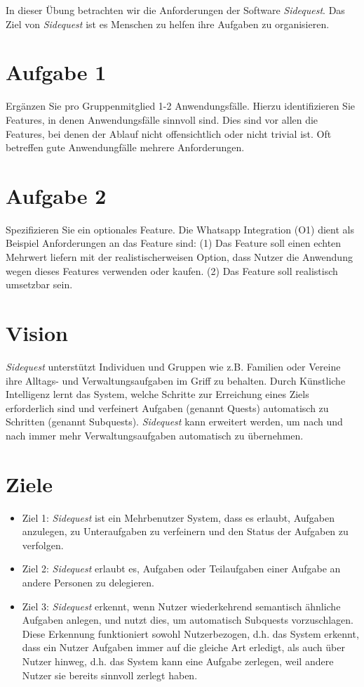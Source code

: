 \documentclass{article}
\begin{document}
\thispagestyle{page1} 
In dieser Übung betrachten wir die Anforderungen der Software \textit{Sidequest}. Das Ziel von \textit{Sidequest} ist es Menschen zu helfen ihre Aufgaben zu organisieren.

\section{Aufgabe 1}
Ergänzen Sie pro Gruppenmitglied 1-2 Anwendungsfälle. Hierzu identifizieren Sie Features, in denen Anwendungsfälle sinnvoll sind. Dies sind vor allen die Features, bei denen der Ablauf nicht offensichtlich oder nicht trivial ist. Oft betreffen gute Anwendungfälle mehrere Anforderungen.

\section{Aufgabe 2}
Spezifizieren Sie ein optionales Feature. Die Whatsapp  Integration (O1) dient als Beispiel Anforderungen an das Feature sind: (1) Das Feature soll einen echten Mehrwert liefern mit der realistischerweisen Option, dass Nutzer die Anwendung wegen dieses Features verwenden oder kaufen. (2) Das Feature soll realistisch umsetzbar sein. 

\section{Vision}

\textit{Sidequest} unterstützt Individuen und Gruppen wie z.B. Familien oder Vereine ihre Alltags- und Verwaltungsaufgaben im Griff zu behalten. Durch Künstliche Intelligenz lernt das System, welche Schritte zur Erreichung eines Ziels erforderlich sind und verfeinert Aufgaben (genannt Quests) automatisch zu Schritten (genannt Subquests). \textit{Sidequest} kann erweitert werden, um nach und nach immer mehr Verwaltungsaufgaben automatisch zu übernehmen. 

\section{Ziele}
\begin{itemize}
\item{Ziel 1:} \textit{Sidequest} ist ein Mehrbenutzer System, dass es erlaubt, Aufgaben anzulegen, zu Unteraufgaben zu verfeinern und den Status der Aufgaben zu verfolgen. 
\item{Ziel 2:} \textit{Sidequest} erlaubt es, Aufgaben oder Teilaufgaben einer Aufgabe an andere Personen zu delegieren. 
\item{Ziel 3:} \textit{Sidequest} erkennt, wenn Nutzer wiederkehrend semantisch ähnliche Aufgaben anlegen, und nutzt dies, um automatisch Subquests vorzuschlagen. Diese Erkennung funktioniert sowohl Nutzerbezogen, d.h. das System erkennt, dass ein Nutzer Aufgaben immer auf die gleiche Art erledigt, als auch über Nutzer hinweg, d.h. das System kann eine Aufgabe zerlegen, weil andere Nutzer sie bereits sinnvoll zerlegt haben.
\end{itemize}
\end{document}
